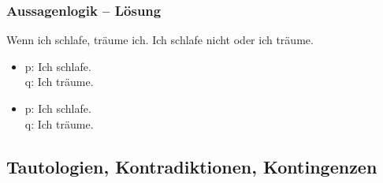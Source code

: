 \begin{frame}
\frametitle{Aussagenlogik -- Lösung}

\begin{exe}
	 Wenn ich schlafe, träume ich.
	 Ich schlafe nicht oder ich träume.
\end{exe}


\begin{minipage}{0.48\textwidth}
\centering
\begin{itemize}
\item[] \small{p: Ich schlafe.\\
q: Ich träume.}
\end{itemize}
\end{minipage}
\begin{minipage}{0.48\textwidth}
\centering
\begin{itemize}
\item[] \small{p: Ich schlafe.\\
q: Ich träume.}
\end{itemize}
\end{minipage}

\end{frame}


%
\subsection{Tautologien, Kontradiktionen, Kontingenzen}


